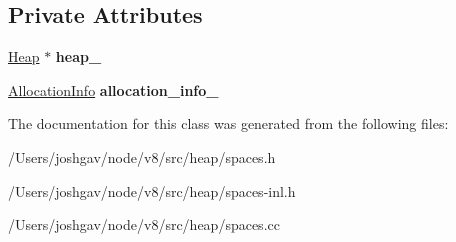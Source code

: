 \subsection*{Private Attributes}
\begin{DoxyCompactItemize}
\item 
\hyperlink{classv8_1_1internal_1_1_heap}{Heap} $\ast$ {\bfseries heap\+\_\+}\hypertarget{classv8_1_1internal_1_1_local_allocation_buffer_a6e282b7f91ae22389764b4075b049de8}{}\label{classv8_1_1internal_1_1_local_allocation_buffer_a6e282b7f91ae22389764b4075b049de8}

\item 
\hyperlink{classv8_1_1internal_1_1_allocation_info}{Allocation\+Info} {\bfseries allocation\+\_\+info\+\_\+}\hypertarget{classv8_1_1internal_1_1_local_allocation_buffer_a35d7b70ab17fb34b7605e257f9f8c007}{}\label{classv8_1_1internal_1_1_local_allocation_buffer_a35d7b70ab17fb34b7605e257f9f8c007}

\end{DoxyCompactItemize}


The documentation for this class was generated from the following files\+:\begin{DoxyCompactItemize}
\item 
/\+Users/joshgav/node/v8/src/heap/spaces.\+h\item 
/\+Users/joshgav/node/v8/src/heap/spaces-\/inl.\+h\item 
/\+Users/joshgav/node/v8/src/heap/spaces.\+cc\end{DoxyCompactItemize}

